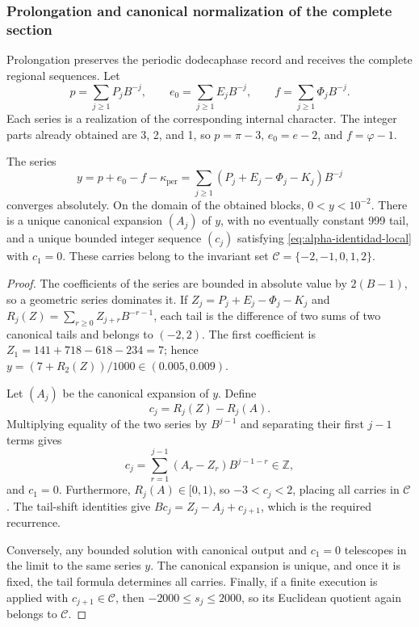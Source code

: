 \subsubsection{Prolongation and canonical normalization of the complete section}
\label{subsec:alpha-completa}

Prolongation preserves the periodic dodecaphase record and receives the complete
regional sequences. Let
\[
 p=\sum_{j\geq1}P_jB^{-j},\qquad
 e_0=\sum_{j\geq1}E_jB^{-j},\qquad
 f=\sum_{j\geq1}\Phi_jB^{-j}.
\]
Each series is a realization of the corresponding internal character.
The integer parts already obtained are 3, 2, and 1, so
\(p=\pi-3\), \(e_0=e-2\), and
\(f=\varphi-1\).

\begin{proposition}
\label{prop:alpha-normalizacion}
The series
\begin{equation}
 y=p+e_0-f-\kappa_{\mathrm{per}}
   =\sum_{j\geq1}(P_j+E_j-\Phi_j-K_j)B^{-j}
 \label{eq:alpha-serie}
\end{equation}
converges absolutely. On the domain of the obtained blocks,
\(0<y<10^{-2}\). There is a unique canonical expansion \((A_j)\) of
\(y\), with no eventually constant 999 tail, and a unique bounded integer
sequence \((c_j)\) satisfying \eqref{eq:alpha-identidad-local} with
\(c_1=0\). These carries belong to the invariant set
\(\mathcal C=\{-2,-1,0,1,2\}\).
\end{proposition}

\begin{proof}
The coefficients of the series are bounded in absolute value by \(2(B-1)\),
so a geometric series dominates it. If
\(Z_j=P_j+E_j-\Phi_j-K_j\) and
\(R_j(Z)=\sum_{r\geq0}Z_{j+r}B^{-r-1}\), each tail is the difference
of two sums of two canonical tails and belongs to \((-2,2)\).
The first coefficient is
\(Z_1=141+718-618-234=7\); hence
\(y=(7+R_2(Z))/1000\in(0.005,0.009)\).

Let \((A_j)\) be the canonical expansion of \(y\). Define
\[
 c_j=R_j(Z)-R_j(A).
\]
Multiplying equality of the two series by \(B^{j-1}\) and separating
their first \(j-1\) terms gives
\[
 c_j=\sum_{r=1}^{j-1}(A_r-Z_r)B^{j-1-r}\in\mathbb Z,
\]
and \(c_1=0\). Furthermore, \(R_j(A)\in[0,1)\), so
\(-3<c_j<2\), placing all carries in \(\mathcal C\).
The tail-shift identities give
\(Bc_j=Z_j-A_j+c_{j+1}\), which is the required recurrence.

Conversely, any bounded solution with canonical output and
\(c_1=0\) telescopes in the limit to the same series \(y\). The canonical
expansion is unique, and once it is fixed, the tail formula determines
all carries. Finally, if a finite execution is applied with
\(c_{j+1}\in\mathcal C\), then \(-2000\leq s_j\leq2000\),
so its Euclidean quotient again belongs to \(\mathcal C\).
\end{proof}


